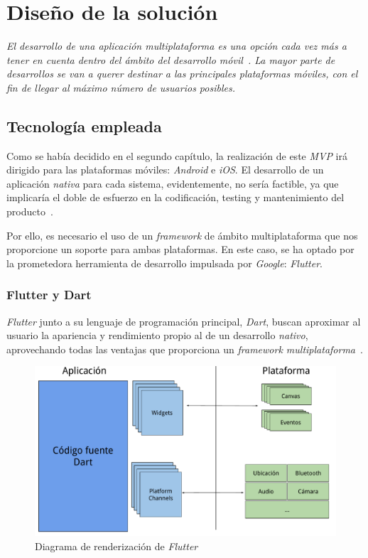 \chapter{Diseño de la solución}
\textit{El desarrollo de una aplicación multiplataforma es una opción cada vez más a tener en 
cuenta dentro del ámbito del desarrollo móvil~\cite{10.1145/3241739}. La mayor parte de desarrollos
se van a querer destinar a las principales plataformas móviles, 
con el fin de llegar al máximo número de usuarios posibles.
}

\section{Tecnología empleada}
Como se había decidido en el segundo capítulo, la realización de este \textit{MVP} irá dirigido para las
plataformas móviles: \textit{Android} e \textit{iOS}. El desarrollo de un aplicación \textit{nativa} para 
cada sistema, evidentemente, no sería factible, ya que implicaría el doble de esfuerzo en la codificación,
testing y mantenimiento del producto~\cite{10.1145/2480362.2480464}.

Por ello, es necesario el uso de un \textit{framework} de ámbito multiplataforma que nos proporcione un
soporte para ambas plataformas. En este caso, se ha optado por la prometedora herramienta de desarrollo
impulsada por \textit{Google}: \textit{Flutter}.

\subsection{Flutter y Dart}
\textit{Flutter} junto a su lenguaje de programación principal, \textit{Dart}, buscan 
aproximar al usuario la apariencia y rendimiento 
propio al de un desarrollo \textit{nativo}, aprovechando todas las ventajas que proporciona 
un \textit{framework multiplataforma}~\cite{7934674}.

\begin{figure}[H]
    \centering
    \includegraphics[scale=0.45]{images/flutter1.pdf}
    \caption{Diagrama de renderización de \textit{Flutter}\cite{leler2019s}}
    \label{fig:flutter1}
  \end{figure}

